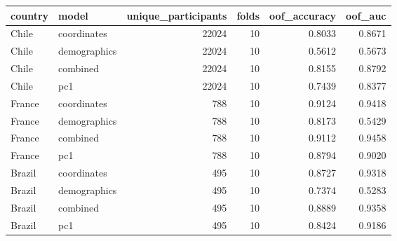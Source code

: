 \begin{tabular}{llrrrr}
\toprule
country & model & unique_participants & folds & oof_accuracy & oof_auc \\
\midrule
Chile & coordinates & 22024 & 10 & 0.8033 & 0.8671 \\
Chile & demographics & 22024 & 10 & 0.5612 & 0.5673 \\
Chile & combined & 22024 & 10 & 0.8155 & 0.8792 \\
Chile & pc1 & 22024 & 10 & 0.7439 & 0.8377 \\
France & coordinates & 788 & 10 & 0.9124 & 0.9418 \\
France & demographics & 788 & 10 & 0.8173 & 0.5429 \\
France & combined & 788 & 10 & 0.9112 & 0.9458 \\
France & pc1 & 788 & 10 & 0.8794 & 0.9020 \\
Brazil & coordinates & 495 & 10 & 0.8727 & 0.9318 \\
Brazil & demographics & 495 & 10 & 0.7374 & 0.5283 \\
Brazil & combined & 495 & 10 & 0.8889 & 0.9358 \\
Brazil & pc1 & 495 & 10 & 0.8424 & 0.9186 \\
\bottomrule
\end{tabular}
